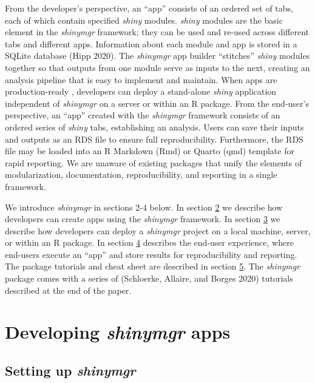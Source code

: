 From the developer's perspective, an ``app'' consists of an ordered set of tabs, each of which contain specified \emph{shiny} modules. \emph{shiny} modules are the basic element in the \emph{shinymgr} framework; they can be used and re-used across different tabs and different apps. Information about each module and app is stored in a SQLite database (Hipp 2020). The \emph{shinymgr} app builder ``stitches'' \emph{shiny} modules together so that outputs from one module serve as inputs to the next, creating an analysis pipeline that is easy to implement and maintain. When apps are production-ready , developers can deploy a stand-alone \emph{shiny} application independent of \emph{shinymgr} on a server or within an R package. From the end-user's perspective, an ``app'' created with the \emph{shinymgr} framework consists of an ordered series of \emph{shiny} tabs, establishing an analysis. Users can save their inputs and outputs as an RDS file to ensure full reproducibility. Furthermore, the RDS file may be loaded into an R Markdown (Rmd) or Quarto (qmd) template for rapid reporting. We are unaware of existing packages that unify the elements of modularization, documentation, reproducibility, and reporting in a single framework.

We introduce \emph{shinymgr} in sections 2-4 below. In section \hyperref[appdev]{2} we describe how developers can create apps using the \emph{shinymgr} framework. In section \hyperref[appdeploy]{3} we describe how developers can deploy a \emph{shinymgr} project on a local machine, server, or within an R package. In section \hyperref[appUsing]{4} describes the end-user experience, where end-users execute an ``app'' and store results for reproducibility and reporting. The package tutorials and cheat sheet are described in section \hyperref[tuts]{5}. The \emph{shinymgr} package comes with a series of  (Schloerke, Allaire, and Borges 2020) tutorials described at the end of the paper.

\section{\texorpdfstring{Developing \emph{shinymgr} apps}{Developing shinymgr apps}}\label{appdev}

\subsection{\texorpdfstring{Setting up \emph{shinymgr}}{Setting up shinymgr}}\label{setting-up-shinymgr}

